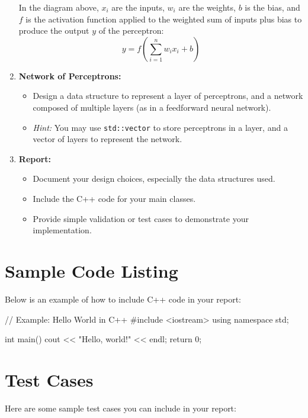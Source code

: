 \documentclass{../LatexStyle/style}
\begin{document}
\begin{instructions}
\begin{enumerate}
    In the diagram above, $x_i$ are the inputs, $w_i$ are the weights, $b$ is the bias, and $f$ is the activation function applied to the weighted sum of inputs plus bias to produce the output $y$ of the perceptron:
    \[
    y = f\left(\sum_{i=1}^{n} w_i x_i + b\right)
    \]

    \item \textbf{Network of Perceptrons:}
    \begin{itemize}
        \item Design a data structure to represent a layer of perceptrons, and a network composed of multiple layers (as in a feedforward neural network).
        \item \textit{Hint:} You may use \texttt{std::vector} to store perceptrons in a layer, and a vector of layers to represent the network.
    \end{itemize}

    \item \textbf{Report:}
    \begin{itemize}
        \item Document your design choices, especially the data structures used.
        \item Include the C++ code for your main classes.
        \item Provide simple validation or test cases to demonstrate your implementation.
    \end{itemize}
\end{enumerate}
\end{instructions}





\section{Sample Code Listing}
Below is an example of how to include C++ code in your report:

\begin{codelisting}
// Example: Hello World in C++
#include <iostream>
using namespace std;

int main() {
    cout << "Hello, world!" << endl;
    return 0;
}
\end{codelisting}

\section{Test Cases}
Here are some sample test cases you can include in your report:
\begin{testcase}
\end{testcase}
\end{document}

